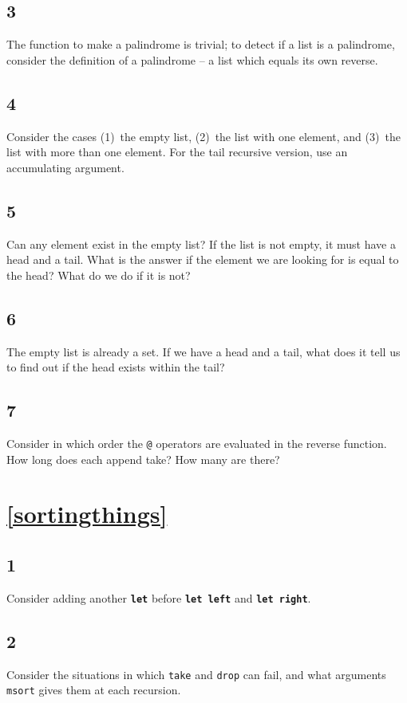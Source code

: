 \documentclass[]{book}
\begin{document}
\subsection*{3}
The function to make a palindrome is trivial; to detect if a list is a palindrome, consider the definition of a palindrome -- a list which equals its own reverse.
\subsection*{4}
Consider the cases (1)~the empty list, (2)~the list with one element, and (3)~the list with more than one element. For the tail recursive version, use an accumulating argument.
\subsection*{5}
Can any element exist in the empty list? If the list is not empty, it must have a head and a tail. What is the answer if the element we are looking for is equal to the head? What do we do if it is not?
\subsection*{6}
The empty list is already a set. If we have a head and a tail, what does it tell us to find out if the head exists within the tail?
\subsection*{7}
Consider in which order the \texttt{@} operators are evaluated in the reverse function. How long does each append take? How many are there?

\section*{\ref{sortingthings}\\ }
\subsection*{1}
Consider adding another \texttt{\textbf{let}} before \texttt{\textbf{let \textmd{left}}} and \texttt{\textbf{let \textmd{right}}}.

\subsection*{2}
Consider the situations in which \texttt{take} and \texttt{drop} can fail, and what arguments \texttt{msort} gives them at each recursion.
\end{document}
